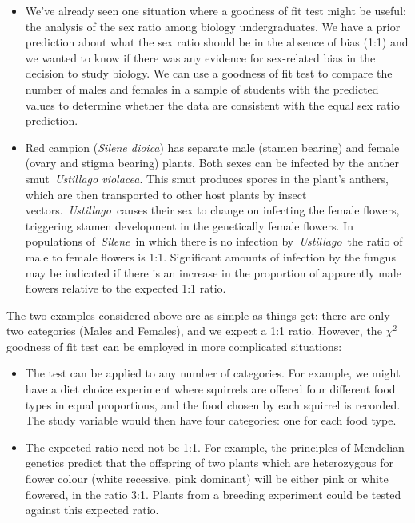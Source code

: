 \documentclass[
]{book}
\begin{document}
\begin{itemize}
\item
  We've already seen one situation where a goodness of fit test might be useful: the analysis of the sex ratio among biology undergraduates. We have a prior prediction about what the sex ratio should be in the absence of bias (1:1) and we wanted to know if there was any evidence for sex-related bias in the decision to study biology. We can use a goodness of fit test to compare the number of males and females in a sample of students with the predicted values to determine whether the data are consistent with the equal sex ratio prediction.
\item
  Red campion (\emph{Silene dioica}) has separate male (stamen bearing) and female (ovary and stigma bearing) plants. Both sexes can be infected by the anther smut~\emph{Ustillago violacea}. This smut produces spores in the plant's anthers, which are then transported to other host plants by insect vectors.~\emph{Ustillago}~causes their sex to change on infecting the female flowers, triggering stamen development in the genetically female flowers. In populations of~\emph{Silene}~in which there is no infection by~\emph{Ustillago}~the ratio of male to female flowers is 1:1. Significant amounts of infection by the fungus may be indicated if there is an increase in the proportion of apparently male flowers relative to the expected 1:1 ratio.
\end{itemize}

The two examples considered above are as simple as things get: there are only two categories (Males and Females), and we expect a 1:1 ratio. However, the \(\chi^{2}\) goodness of fit test can be employed in more complicated situations:

\begin{itemize}
\item
  The test can be applied to any number of categories. For example, we might have a diet choice experiment where squirrels are offered four different food types in equal proportions, and the food chosen by each squirrel is recorded. The study variable would then have four categories: one for each food type.
\item
  The expected ratio need not be 1:1. For example, the principles of Mendelian genetics predict that the offspring of two plants which are heterozygous for flower colour (white recessive, pink dominant) will be either pink or white flowered, in the ratio 3:1. Plants from a breeding experiment could be tested against this expected ratio.
\end{itemize}
\end{document}
